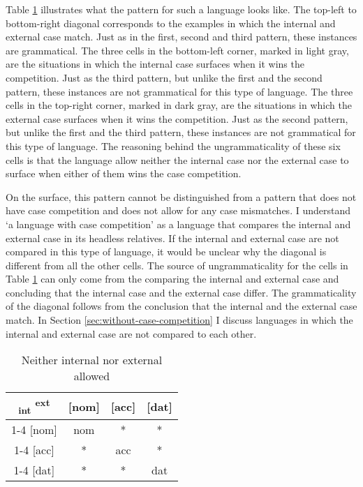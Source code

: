 Table \ref{tbl:case-competition-none} illustrates what the pattern for such a language looks like.
The top-left to bottom-right diagonal corresponds to the examples in which the internal and external case match. Just as in the first, second and third pattern, these instances are grammatical.
The three cells in the bottom-left corner, marked in light gray, are the situations in which the internal case surfaces when it wins the competition. Just as the third pattern, but unlike the first and the second pattern, these instances are not grammatical for this type of language.
The three cells in the top-right corner, marked in dark gray, are the situations in which the external case surfaces when it wins the competition. Just as the second pattern, but unlike the first and the third pattern, these instances are not grammatical for this type of language. The reasoning behind the ungrammaticality of these six cells is that the language allow neither the internal case nor the external case to surface when either of them wins the case competition.

On the surface, this pattern cannot be distinguished from a pattern that does not have case competition and does not allow for any case mismatches. I understand `a language with case competition' as a language that compares the internal and external case in its headless relatives. If the internal and external case are not compared in this type of language, it would be unclear why the diagonal is different from all the other cells. The source of ungrammaticality for the cells in Table \ref{tbl:case-competition-none} can only come from the comparing the internal and external case and concluding that the internal case and the external case differ. The grammaticality of the diagonal follows from the conclusion that the internal and the external case match. In Section \ref{sec:without-case-competition} I discuss languages in which the internal and external case are not compared to each other.

\begin{table}[H]
  \center
  \caption{Neither internal nor external allowed}
  \begin{tabular}{c|c|c|c}
    \toprule
    \textsubscript{\ac{int}} \textsuperscript{\ac{ext}}
           & [\ac{nom}]
           & [\ac{acc}]
           & [\ac{dat}]
           \\ \cmidrule{1-4}
       [\ac{nom}]
           & \ac{nom}
           & \cellcolor{DG}*
           & \cellcolor{DG}*
           \\ \cmidrule{1-4}
       [\ac{acc}]
           & \cellcolor{LG}*
           & \ac{acc}
           & \cellcolor{DG}*
           \\ \cmidrule{1-4}
       [\ac{dat}]
           & \cellcolor{LG}*
           & \cellcolor{LG}*
           & \ac{dat}
           \\
     \bottomrule
  \end{tabular}
    \label{tbl:case-competition-none}
\end{table}

